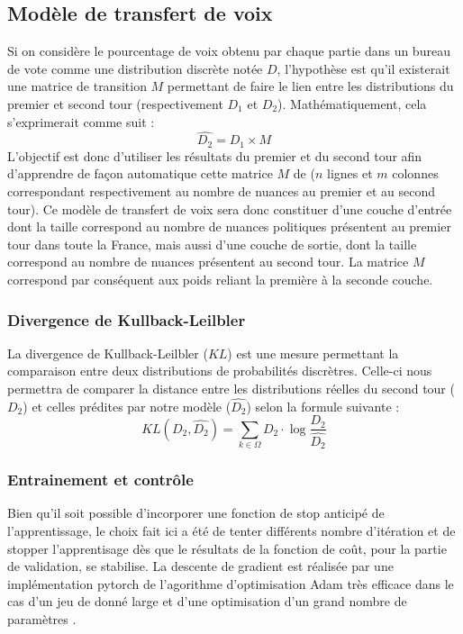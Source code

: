 \documentclass[11pt]{article}
\begin{document}
        \subsection*{Modèle de transfert de voix}
            Si on considère le pourcentage de voix obtenu par chaque partie dans un bureau de vote comme une distribution discrète notée $D$, l'hypothèse est qu'il existerait une matrice de transition $M$ permettant de faire le lien entre les distributions du premier et second tour (respectivement $D_1$ et $D_2$). Mathématiquement, cela s'exprimerait comme suit :
            \begin{equation}
                \hat{D_2} = D_1 \times M
            \end{equation}
            L'objectif est donc d'utiliser les résultats du premier et du second tour afin d'apprendre de façon automatique cette matrice $M$ de ($n$ lignes et $m$ colonnes correspondant respectivement au nombre de nuances au premier et au second tour). Ce modèle de transfert de voix sera donc constituer d'une couche d'entrée dont la taille correspond au nombre de nuances politiques présentent au premier tour dans toute la France, mais aussi d'une couche de sortie, dont la taille correspond au nombre de nuances présentent au second tour. La matrice $M$ correspond par conséquent aux poids reliant la première à la seconde couche. 


        \subsubsection*{Divergence de Kullback-Leilbler}
            La divergence de Kullback-Leilbler \cite{Kullback_Leibler_1951} ($KL$) est une mesure permettant la comparaison entre deux distributions de probabilités discrètres. Celle-ci nous permettra de comparer la distance entre les distributions réelles du second tour ($D_2$) et celles prédites par notre modèle ($\hat{D_2}$) selon la formule suivante :
            \begin{equation}
                KL(D_2,\hat{D_2}) = \sum_{k \in \Omega} D_2 \cdot \log \frac{D_2}{\hat{D_2}}
            \end{equation}

        \subsubsection*{Entrainement et contrôle}
            Bien qu'il soit possible d'incorporer une fonction de stop anticipé de l'apprentissage, le choix fait ici a été de tenter différents nombre d'itération et de stopper l'apprentisage dès que le résultats de la fonction de coût, pour la partie de validation, se stabilise. La descente de gradient est réalisée par une implémentation pytorch de l'agorithme d'optimisation Adam très efficace dans le cas d'un jeu de donné large et d'une optimisation d'un grand nombre de paramètres \cite{Kingma_Ba_2017}.
\end{document}
